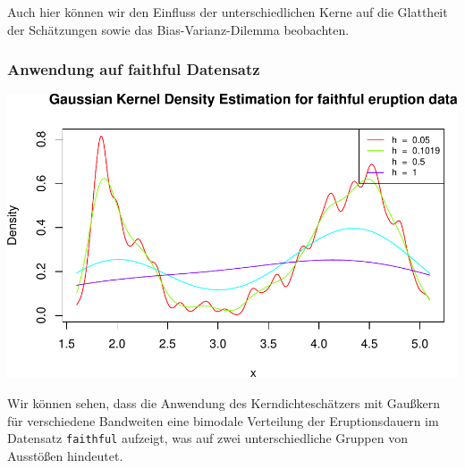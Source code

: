 \documentclass[10pt,]{article}
\newenvironment{Shaded}{\begin{snugshade}}{\end{snugshade}}
\newcommand{\KeywordTok}[1]{\textcolor[rgb]{0.13,0.29,0.53}{\textbf{{#1}}}}
\newcommand{\DataTypeTok}[1]{\textcolor[rgb]{0.13,0.29,0.53}{{#1}}}
\newcommand{\DecValTok}[1]{\textcolor[rgb]{0.00,0.00,0.81}{{#1}}}
\newcommand{\FloatTok}[1]{\textcolor[rgb]{0.00,0.00,0.81}{{#1}}}
\newcommand{\StringTok}[1]{\textcolor[rgb]{0.31,0.60,0.02}{{#1}}}
\newcommand{\CommentTok}[1]{\textcolor[rgb]{0.56,0.35,0.01}{\textit{{#1}}}}
\newcommand{\NormalTok}[1]{{#1}}
\begin{document}
Auch hier können wir den Einfluss der unterschiedlichen Kerne auf die
Glattheit der Schätzungen sowie das Bias-Varianz-Dilemma beobachten.

\subsubsection{Anwendung auf faithful
Datensatz}\label{anwendung-auf-faithful-datensatz}

\begin{Shaded}
\end{Shaded}

\includegraphics{project2_files/figure-latex/faithful kernel density estimation-1.pdf}

Wir können sehen, dass die Anwendung des Kerndichteschätzers mit
Gaußkern für verschiedene Bandweiten eine bimodale Verteilung der
Eruptionsdauern im Datensatz \texttt{faithful} aufzeigt, was auf zwei
unterschiedliche Gruppen von Ausstößen hindeutet.
\end{document}
